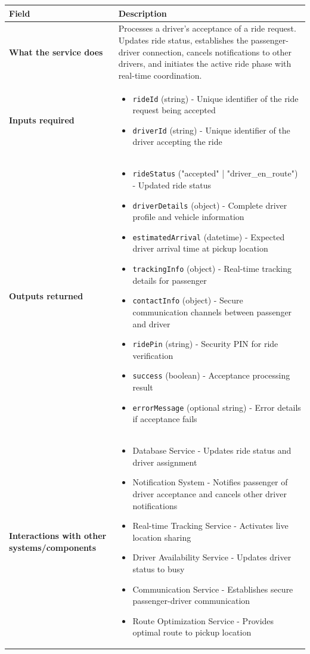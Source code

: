 \documentclass[11pt,a4paper]{article}
\begin{document}
\begin{longtable}{|p{4cm}|p{12cm}|}
\hline
\textbf{Field} & \textbf{Description} \\
\hline
\textbf{What the service does} & 
Processes a driver's acceptance of a ride request. Updates ride status, establishes the passenger-driver connection, cancels notifications to other drivers, and initiates the active ride phase with real-time coordination. \\
\hline
\textbf{Inputs required} & 
\begin{itemize}[nosep]
\item \texttt{rideId} (string) - Unique identifier of the ride request being accepted
\item \texttt{driverId} (string) - Unique identifier of the driver accepting the ride
\end{itemize} \\
\hline
\textbf{Outputs returned} & 
\begin{itemize}[nosep]
\item \texttt{rideStatus} ("accepted" | "driver\_en\_route") - Updated ride status
\item \texttt{driverDetails} (object) - Complete driver profile and vehicle information
\item \texttt{estimatedArrival} (datetime) - Expected driver arrival time at pickup location
\item \texttt{trackingInfo} (object) - Real-time tracking details for passenger
\item \texttt{contactInfo} (object) - Secure communication channels between passenger and driver
\item \texttt{ridePin} (string) - Security PIN for ride verification
\item \texttt{success} (boolean) - Acceptance processing result
\item \texttt{errorMessage} (optional string) - Error details if acceptance fails
\end{itemize} \\
\hline
\textbf{Interactions with other systems/components} & 
\begin{itemize}[nosep]
\item Database Service - Updates ride status and driver assignment
\item Notification System - Notifies passenger of driver acceptance and cancels other driver notifications
\item Real-time Tracking Service - Activates live location sharing
\item Driver Availability Service - Updates driver status to busy
\item Communication Service - Establishes secure passenger-driver communication
\item Route Optimization Service - Provides optimal route to pickup location
\end{itemize} \\
\hline
\end{longtable}
\end{document}
